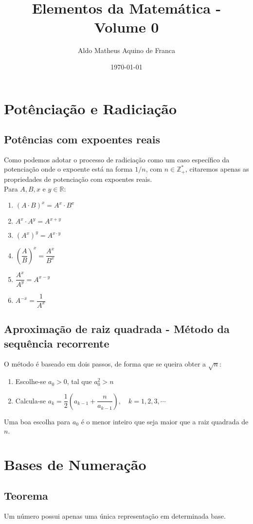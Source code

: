 \documentclass{article}
\title{Elementos da Matemática - Volume 0}
\author{Aldo Matheus Aquino de Franca}
\date{\today}
\begin{document}
\maketitle
 
\section{Potênciação e Radiciação}
\subsection{Potências com expoentes reais}
Como podemos adotar o processo de radiciação como um caso específico da potenciação onde o expoente está na forma $1/n$, com $n\in\mathbb{Z}_+^*$, citaremos apenas as propriedades de potenciação com expoentes reais.\\
\indent Para $A,B,x\text{ e }y\in\mathbb{R}$:
\begin{enumerate}[\quad 1)]
    \item $(A\cdot B)^x=A^x\cdot B^x$
    \item $A^x\cdot A^y=A^{x+y}$
    \item $(A^x)^y=A^{x\cdot y}$
    \item $\left(\dfrac{A}{B}\right)^x=\dfrac{A^x}{B^x}$
    \item $\dfrac{A^x}{A^y}=A^{x-y}$
    \item $A^{-x}=\dfrac{1}{A^x}$
\end{enumerate}

\subsection{Aproximação de raiz quadrada - Método da sequência recorrente}
O método é baseado em dois passos, de forma que se queira obter a $\sqrt{n}$:
\begin{enumerate}[\quad 1)]
    \item Escolhe-se $a_0>0$, tal que $a_0^2> n$
    \item Calcula-se $a_k=\dfrac{1}{2}\left(a_{k-1}+\dfrac{n}{a_{k-1}}\right),\quad k=1,2,3,\cdots$
\end{enumerate}
\indent \indent Uma boa escolha para $a_0$ é o menor inteiro que seja maior que a raiz quadrada de $n$.

\section{Bases de Numeração}
\subsection{Teorema}
Um número possui apenas uma única representação em determinada base.
\end{document}
